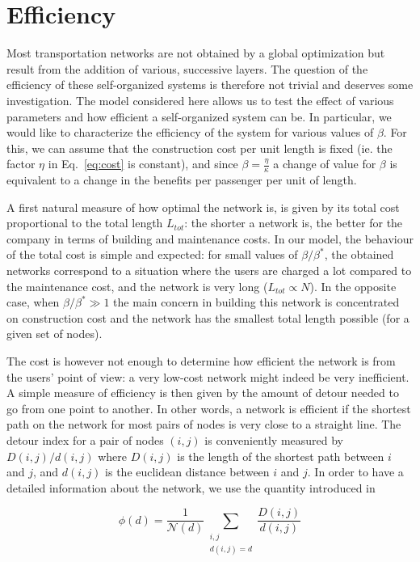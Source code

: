 \section{Efficiency}

Most transportation networks are not obtained by a global optimization but
result from the addition of various, successive layers. The question of the
efficiency of these self-organized systems is therefore not trivial and deserves
some investigation. The model considered here allows us to test the effect of
various parameters and how efficient a self-organized system can be. In
particular, we would like to characterize the efficiency of the system for
various values of $\beta$. For this, we can assume that the construction cost
per unit length is fixed (ie. the factor $\eta$ in Eq.~\ref{eq:cost} is
constant), and since $\beta = \frac{\eta}{\kappa}$ a change of value for $\beta$
is equivalent to a change in the benefits per passenger per unit of length. 

A first natural measure of how optimal the network is, is given by its total
cost proportional to the total length $L_{tot}$: the shorter a network is, the
better for the company in terms of building and maintenance costs. In our model,
the behaviour of the total cost is simple and expected: for small values of
$\beta/\beta^*$, the obtained networks correspond to a situation where the users
are charged a lot compared to the maintenance cost, and the network is very long
($L_{tot}\propto N$). In the opposite case, when $\beta/\beta^* \gg 1$ the main
concern in building this network is concentrated on construction cost and the
network has the smallest total length possible (for a given set of nodes). 

The cost is however not enough to determine how efficient the network is from
the users' point of view: a very low-cost network might indeed be very
inefficient. A simple measure of efficiency is then given by the amount of
detour needed to go from one point to another. In other words, a network is
efficient if the shortest path on the network for most pairs of nodes is very
close to a straight line. The detour index for a pair of nodes $(i,j)$ is
conveniently measured by $D(i,j)/d(i,j)$ where $D(i,j)$ is the length of the
shortest path between $i$ and $j$, and $d(i,j)$ is the euclidean distance
between $i$ and $j$. In order to have a detailed information about the network,
we use the quantity introduced in~\cite{Aldous:2010}

\begin{equation}
    \phi(d) = \frac{1}{\mathcal{N}(d)} \sum_{\substack{i,j\\d(i,j) =d}} \frac{D(i,j)}{d(i,j)}
\end{equation}

